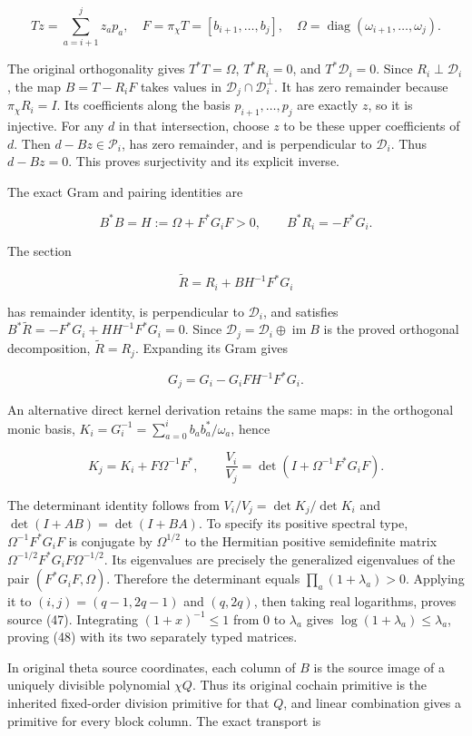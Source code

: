 \[
Tz=\sum_{a=i+1}^{j}z_a p_a,\quad
F=\pi_\chi T=[b_{i+1},\ldots,b_j],\quad
\Omega=\operatorname{diag}(\omega_{i+1},\ldots,\omega_j).
\]

The original orthogonality gives \(T^*T=\Omega\), \(T^*R_i=0\), and \(T^*\mathcal D_i=0\). Since \(R_i\perp\mathcal D_i\), the map \(B=T-R_iF\) takes values in \(\mathcal D_j\cap\mathcal D_i^\perp\). It has zero remainder because \(\pi_\chi R_i=I\). Its coefficients along the basis \(p_{i+1},\ldots,p_j\) are exactly \(z\), so it is injective. For any \(d\) in that intersection, choose \(z\) to be these upper coefficients of \(d\). Then \(d-Bz\in\mathcal P_i\), has zero remainder, and is perpendicular to \(\mathcal D_i\). Thus \(d-Bz=0\). This proves surjectivity and its explicit inverse.

The exact Gram and pairing identities are

\[
B^*B=H:=\Omega+F^*G_iF>0,\qquad B^*R_i=-F^*G_i.
\]

The section

\[
\widetilde R=R_i+BH^{-1}F^*G_i
\]

has remainder identity, is perpendicular to \(\mathcal D_i\), and satisfies \(B^*\widetilde R=-F^*G_i+HH^{-1}F^*G_i=0\). Since \(\mathcal D_j=\mathcal D_i\oplus\operatorname{im}B\) is the proved orthogonal decomposition, \(\widetilde R=R_j\). Expanding its Gram gives

\[
G_j=G_i-G_iFH^{-1}F^*G_i.
\]

An alternative direct kernel derivation retains the same maps: in the orthogonal monic basis, \(K_i=G_i^{-1}=\sum_{a=0}^i b_a b_a^*/\omega_a\), hence

\[
K_j=K_i+F\Omega^{-1}F^*,\qquad
\frac{V_i}{V_j}=\det(I+\Omega^{-1}F^*G_iF).
\]

The determinant identity follows from \(V_i/V_j=\det K_j/\det K_i\) and \(\det(I+AB)=\det(I+BA)\). To specify its positive spectral type, \(\Omega^{-1}F^*G_iF\) is conjugate by \(\Omega^{1/2}\) to the Hermitian positive semidefinite matrix \(\Omega^{-1/2}F^*G_iF\Omega^{-1/2}\). Its eigenvalues are precisely the generalized eigenvalues of the pair \((F^*G_iF,\Omega)\). Therefore the determinant equals \(\prod_a(1+\lambda_a)>0\). Applying it to \((i,j)=(q-1,2q-1)\) and \((q,2q)\), then taking real logarithms, proves source (47). Integrating \((1+x)^{-1}\le1\) from 0 to \(\lambda_a\) gives \(\log(1+\lambda_a)\le\lambda_a\), proving (48) with its two separately typed matrices.

In original theta source coordinates, each column of \(B\) is the source image of a uniquely divisible polynomial \(\chi Q\). Thus its original cochain primitive is the inherited fixed-order division primitive for that \(Q\), and linear combination gives a primitive for every block column. The exact transport is

